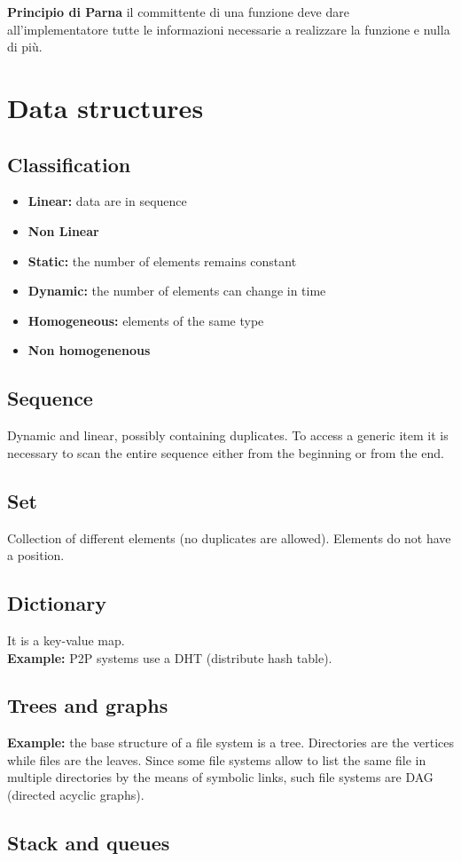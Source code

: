 \documentclass[10pt,a4paper]{book}
\begin{document}
\textbf{Principio di Parna} il committente di una funzione deve dare all'implementatore tutte le informazioni necessarie a realizzare la funzione e nulla di più.
\chapter{Data structures}
\section*{Classification}
\begin{itemize}
\item \textbf{Linear:} data are in sequence
\item \textbf{Non Linear}
\item \textbf{Static:} the number of elements remains constant
\item \textbf{Dynamic:} the number of elements can change in time
\item \textbf{Homogeneous:} elements of the same type
\item \textbf{Non homogenenous}
\end{itemize}
\section{Sequence}
Dynamic and linear, possibly containing duplicates. To access a generic item it is necessary to scan the entire sequence either from the beginning or from the end.
\section{Set}
Collection of different elements (no duplicates are allowed). Elements do not have a position.
\section{Dictionary}
It is a key-value map.\\
\textbf{Example:} P2P systems use a DHT (distribute hash table).
\section{Trees and graphs}
\textbf{Example:} the base structure of a file system is a tree. Directories are the vertices while files are the leaves. Since some file systems allow to list the same file in multiple directories by the means of symbolic links, such file systems are DAG (directed acyclic graphs).
\section{Stack and queues}
\end{document}
